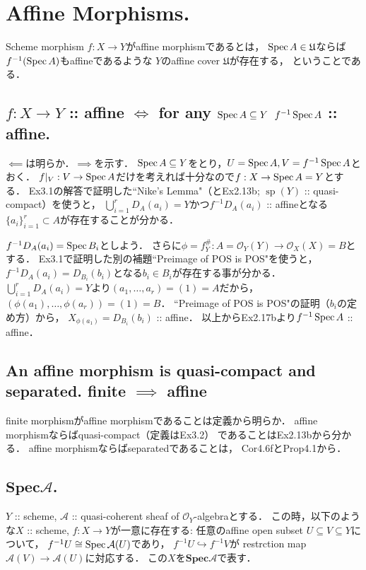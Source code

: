 \documentclass[a4paper]{jsarticle}
\newcommand{\shA}{\mathcal{A}}
\newcommand{\shO}{\mathcal{O}}
\newcommand{\basesp}{\operatorname{sp}}
\newcommand{\bfSpec}{\mathbf{Spec}}
\newcommand{\coverU}{\mathfrak{U}}
\begin{document}
\section{Affine Morphisms.} %
    Scheme morphism $f: X \to Y$がaffine morphismであるとは，
    $\Spec A \in \coverU$ならば$f^{-1}(\operatorname{Spec} A)$もaffineであるような
    $Y$のaffine cover $\coverU$が存在する，
    ということである．

    \subsection{$f: X \to Y$ :: affine $\iff$ for any $\operatorname{Spec} A \subseteq Y$ $f^{-1}\operatorname{Spec} A$ :: affine.}
    $\impliedby$は明らか．$\implies$を示す．
    $\operatorname{Spec} A \subseteq Y$をとり，$U=\operatorname{Spec} A, V=f^{-1} \operatorname{Spec} A$とおく．
    $f|_V: V \to \operatorname{Spec} A$だけを考えれば十分なので$f: X \to \operatorname{Spec} A=Y$とする．
    Ex3.1の解答で証明した``Nike’s Lemma"（とEx2.13b; $\basesp(Y)$ :: quasi-compact）を使うと，
    $\bigcup_{i=1}^r D_A(a_i)=Y$かつ$f^{-1} D_A(a_i)$ :: affineとなる
    $\{a_i\}_{i=1}^r \subset A$が存在することが分かる．

    $f^{-1} D_A(a_i)=\operatorname{Spec} B_i$としよう．
    さらに$\phi=f^{\#}_Y: A=\shO_Y(Y) \to \shO_X(X)=B$とする．
    Ex3.1で証明した別の補題``Preimage of POS is POS"を使うと，
    $f^{-1} D_A(a_i)=D_{B_i}(b_i)$となる$b_i \in B_i$が存在する事が分かる．
    $\bigcup_{i=1}^r D_A(a_i)=Y$より$(a_1,\dots,a_r)=(1)=A$だから，
    $(\phi(a_1), \dots,\phi(a_r))=(1)=B$．
    ``Preimage of POS is POS"の証明（$b_i$の定め方）から，
    $X_{\phi(a_1)}=D_{B_i}(b_i)$ :: affine．
    以上からEx2.17bより$f^{-1}\operatorname{Spec} A$ :: affine．

    \subsection{An affine morphism is quasi-compact and separated. finite $\implies$ affine}
    finite morphismがaffine morphismであることは定義から明らか．
    affine morphismならばquasi-compact（定義はEx3.2）
    であることはEx2.13bから分かる．
    affine morphismならばseparatedであることは，
    Cor4.6fとProp4.1から．
    
    \subsection{$\bfSpec \shA$.}
    $Y$ :: scheme, $\shA$ :: quasi-coherent sheaf of $\shO_Y$-algebraとする．
    この時，以下のような$X$ :: scheme, $f : X \to Y$が一意に存在する:
    任意のaffine open subset $U \subseteq V \subseteq Y$について，
    $f^{-1}U \iso \Spec \shA(U)$であり，
    $f^{-1}U \hookrightarrow f^{-1}V$が
    restrction map $\shA(V) \to \shA(U)$に対応する．
    この$X$を$\bfSpec \shA$で表す．
\end{document}
